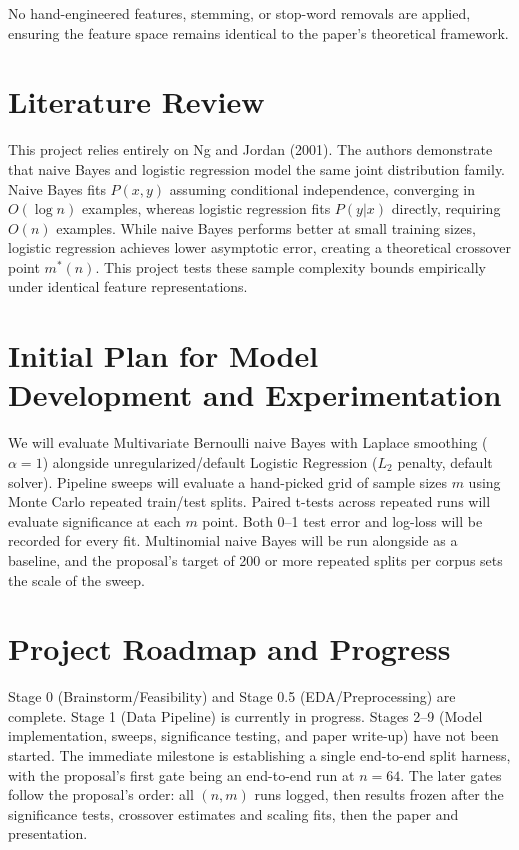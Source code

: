 \documentclass[11pt]{article}
\begin{document}
No hand-engineered features, stemming, or stop-word removals are applied, ensuring the feature space remains identical to the paper's theoretical framework.

\section{Literature Review}

This project relies entirely on Ng and Jordan (2001). The authors demonstrate that naive Bayes and logistic regression model the same joint distribution family. Naive Bayes fits $P(x, y)$ assuming conditional independence, converging in $O(\log n)$ examples, whereas logistic regression fits $P(y|x)$ directly, requiring $O(n)$ examples. While naive Bayes performs better at small training sizes, logistic regression achieves lower asymptotic error, creating a theoretical crossover point $m^*(n)$. This project tests these sample complexity bounds empirically under identical feature representations.

\section{Initial Plan for Model Development and Experimentation}

We will evaluate Multivariate Bernoulli naive Bayes with Laplace smoothing ($\alpha = 1$) alongside unregularized/default Logistic Regression ($L_2$ penalty, default solver). Pipeline sweeps will evaluate a hand-picked grid of sample sizes $m$ using Monte Carlo repeated train/test splits. Paired t-tests across repeated runs will evaluate significance at each $m$ point. Both 0--1 test error and log-loss will be recorded for every fit. Multinomial naive Bayes will be run alongside as a baseline, and the proposal's target of 200 or more repeated splits per corpus sets the scale of the sweep.

\section{Project Roadmap and Progress}

Stage 0 (Brainstorm/Feasibility) and Stage 0.5 (EDA/Preprocessing) are complete. Stage 1 (Data Pipeline) is currently in progress. Stages 2--9 (Model implementation, sweeps, significance testing, and paper write-up) have not been started. The immediate milestone is establishing a single end-to-end split harness, with the proposal's first gate being an end-to-end run at $n = 64$. The later gates follow the proposal's order: all $(n, m)$ runs logged, then results frozen after the significance tests, crossover estimates and scaling fits, then the paper and presentation.
\end{document}
